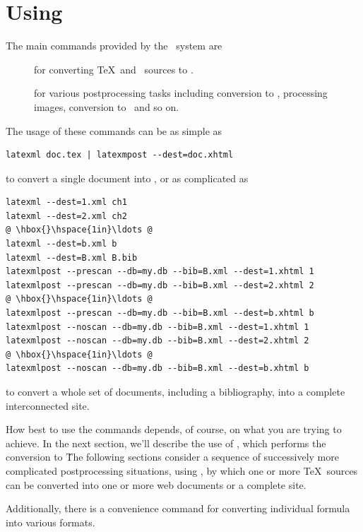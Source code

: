 \documentclass{book}
\begin{document}
\chapter{Using \LaTeXML}\label{usage}
The main commands provided by the \LaTeXML\ system are
\begin{description}
\item[] for converting \TeX\ and \BibTeX\ sources to \XML.
\item[] for various postprocessing tasks including
conversion to \HTML, processing images, conversion to \MathML\ and so on.
\end{description}
\noindent The usage of these commands can be as simple as
\begin{lstlisting}[style=shell]
latexml doc.tex | latexmpost --dest=doc.xhtml
\end{lstlisting}
\noindent to convert a single document into \HTML,  or as complicated as
\begin{lstlisting}[style=shell]
latexml --dest=1.xml ch1
latexml --dest=2.xml ch2
@ \hbox{}\hspace{1in}\ldots @
latexml --dest=b.xml b
latexml --dest=B.xml B.bib
latexmlpost --prescan --db=my.db --bib=B.xml --dest=1.xhtml 1
latexmlpost --prescan --db=my.db --bib=B.xml --dest=2.xhtml 2
@ \hbox{}\hspace{1in}\ldots @
latexmlpost --prescan --db=my.db --bib=B.xml --dest=b.xhtml b
latexmlpost --noscan --db=my.db --bib=B.xml --dest=1.xhtml 1
latexmlpost --noscan --db=my.db --bib=B.xml --dest=2.xhtml 2
@ \hbox{}\hspace{1in}\ldots @
latexmlpost --noscan --db=my.db --bib=B.xml --dest=b.xhtml b
\end{lstlisting}
\noindent to convert a whole set of documents, including a bibliography,
into a complete interconnected site.

How best to use the commands depends, of course, on what you
are trying to achieve.  In the next section, we'll describe
the use of , which performs the conversion to \XML\.
The following sections consider a sequence of
successively more complicated postprocessing situations,
using ,
by which one or more \TeX\ sources can be converted into
one or more web documents or a complete site.

Additionally, there is a convenience command 
for converting individual formula into various formats.

\end{document}
